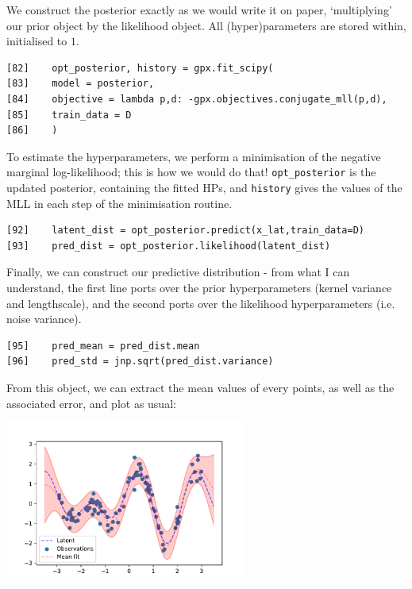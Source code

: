 \documentclass[12pt]{article}
\begin{document}
    \begin{bestbox}
        We construct the posterior exactly as we would write it on paper, `multiplying' our prior object by the likelihood object. All (hyper)parameters are stored within, initialised to $1$.
    \end{bestbox}
    \begin{verbatim}[82]    opt_posterior, history = gpx.fit_scipy(
[83]    model = posterior,
[84]    objective = lambda p,d: -gpx.objectives.conjugate_mll(p,d),
[85]    train_data = D
[86]    )\end{verbatim}
    \begin{bestbox}
        To estimate the hyperparameters, we perform a minimisation of the negative marginal log-likelihood; this is how we would do that! \verb|opt_posterior| is the updated posterior, containing the fitted HPs, and \verb|history| gives the values of the MLL in each step of the minimisation routine.
    \end{bestbox}
    \begin{verbatim}[92]    latent_dist = opt_posterior.predict(x_lat,train_data=D)
[93]    pred_dist = opt_posterior.likelihood(latent_dist)\end{verbatim}
    \begin{bestbox}
        Finally, we can construct our predictive distribution - from what I can understand, the first line ports over the prior hyperparameters (kernel variance and lengthscale), and the second ports over the likelihood hyperparameters (i.e. noise variance). 
    \end{bestbox}
    \begin{verbatim}[95]    pred_mean = pred_dist.mean
[96]    pred_std = jnp.sqrt(pred_dist.variance)\end{verbatim}
    \begin{bestbox}
        From this object, we can extract the mean values of every points, as well as the associated error, and plot as usual:
        \begin{center}
            \includegraphics[width=8cm]{gpjax_result.pdf}
        \end{center}
    \end{bestbox}
\end{document}
